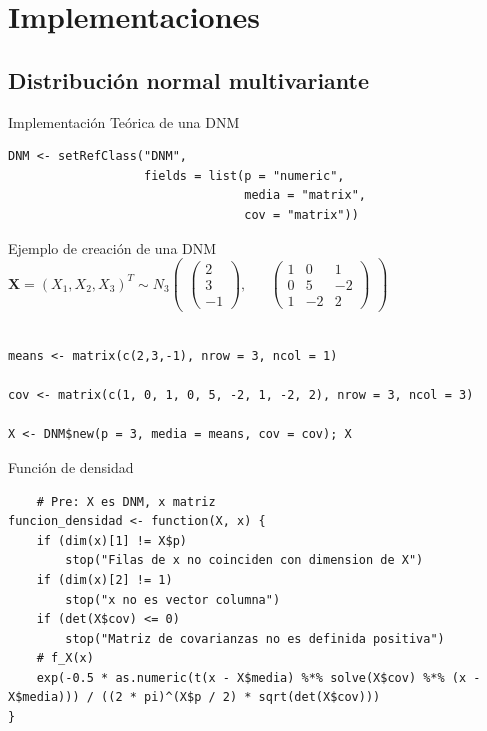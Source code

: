 \documentclass[xcolor=table]{beamer}
\begin{document}
\section{Implementaciones}
\subsection{Distribución normal multivariante}
\begin{frame}[fragile]{Implementación Teórica de una DNM}

\begin{lstlisting}
DNM <- setRefClass("DNM", 
                   fields = list(p = "numeric", 
                                 media = "matrix", 
                                 cov = "matrix"))
\end{lstlisting}
\end{frame}


\begin{frame}[fragile]{Ejemplo de creación de una DNM}
$\pmb{X} = (X_1, X_2, X_3)^T \sim N_3 \begin{pmatrix} \begin{pmatrix} 2 \\ 3 \\ -1 \end{pmatrix}, && \begin{pmatrix} 1 & 0 & 1 \\ 0 & 5 & -2 \\ 1 & -2 & 2 \end{pmatrix} \end{pmatrix} $

\begin{lstlisting}

means <- matrix(c(2,3,-1), nrow = 3, ncol = 1)

cov <- matrix(c(1, 0, 1, 0, 5, -2, 1, -2, 2), nrow = 3, ncol = 3)

X <- DNM$new(p = 3, media = means, cov = cov); X

\end{lstlisting}
\end{frame}

\begin{frame}[fragile]{Función de densidad}
\small
  \begin{lstlisting}
    # Pre: X es DNM, x matriz
funcion_densidad <- function(X, x) {
    if (dim(x)[1] != X$p)
        stop("Filas de x no coinciden con dimension de X")
    if (dim(x)[2] != 1)
        stop("x no es vector columna")
    if (det(X$cov) <= 0)
        stop("Matriz de covarianzas no es definida positiva")
    # f_X(x)
    exp(-0.5 * as.numeric(t(x - X$media) %*% solve(X$cov) %*% (x - X$media))) / ((2 * pi)^(X$p / 2) * sqrt(det(X$cov)))
}
  \end{lstlisting}
\end{frame}
\end{document}
